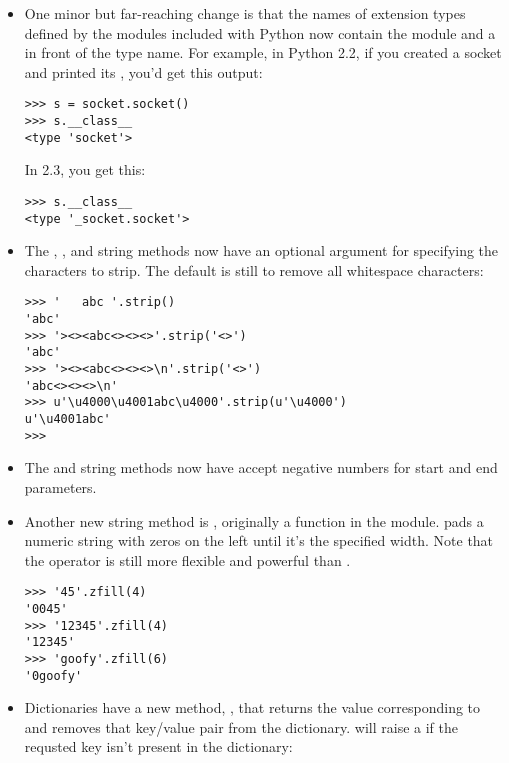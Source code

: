\documentclass{howto}
\begin{document}
\begin{itemize}

\item One minor but far-reaching change is that the names of extension
types defined by the modules included with Python now contain the
module and a  in front of the type name.  For example, in
Python 2.2, if you created a socket and printed its
, you'd get this output:

\begin{verbatim}
>>> s = socket.socket()
>>> s.__class__
<type 'socket'>
\end{verbatim}

In 2.3, you get this:
\begin{verbatim}
>>> s.__class__
<type '_socket.socket'>
\end{verbatim}

\item The , , and 
string methods now have an optional argument for specifying the
characters to strip.  The default is still to remove all whitespace
characters:

\begin{verbatim}
>>> '   abc '.strip()
'abc'
>>> '><><abc<><><>'.strip('<>')
'abc'
>>> '><><abc<><><>\n'.strip('<>')
'abc<><><>\n'
>>> u'\u4000\u4001abc\u4000'.strip(u'\u4000')
u'\u4001abc'
>>>
\end{verbatim}

\item The  and 
string methods now have accept negative numbers for
start and end parameters.

\item Another new string method is , originally a
function in the  module.   pads a
numeric string with zeros on the left until it's the specified width.
Note that the \code{\%} operator is still more flexible and powerful
than .

\begin{verbatim}
>>> '45'.zfill(4)
'0045'
>>> '12345'.zfill(4)
'12345'
>>> 'goofy'.zfill(6)
'0goofy'
\end{verbatim}

\item Dictionaries have a new method, , that
returns the value corresponding to  and removes that
key/value pair from the dictionary.   will raise a
 if the requsted key isn't present in the
dictionary:


\end{itemize}
\end{document}
